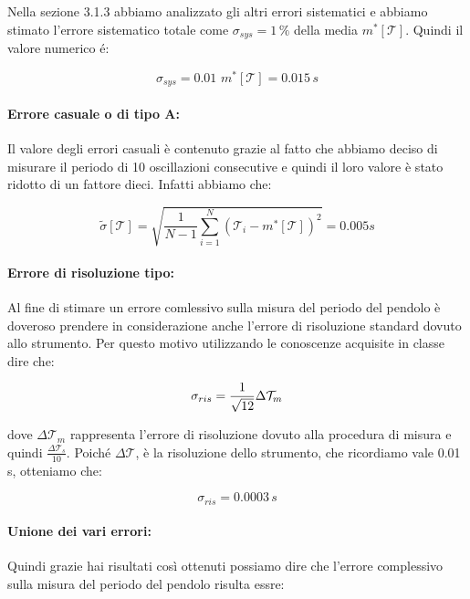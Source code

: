 Nella sezione 3.1.3 abbiamo analizzato gli altri errori sistematici e abbiamo stimato l'errore sistematico totale come $\sigma_{sys} = 1\,\%$ della media $m^*[\mathcal{T}]$. Quindi il valore numerico é:

\begin{equation*}
	\sigma_{sys} = 0.01\,\,m^*[\mathcal{T}] = 0.015\,s
\end{equation*}

\paragraph{Errore casuale o di tipo A:}
Il valore degli errori casuali è contenuto grazie al fatto che abbiamo deciso di misurare il periodo di 10 oscillazioni consecutive e quindi il loro valore è stato ridotto di un fattore dieci. Infatti abbiamo che:

\begin{equation*}
	\tilde{\sigma}[\mathcal{T}] = \sqrt{\frac{1}{N - 1} \sum_{i=1}^{N} (\mathcal{T}_i - m^*[\mathcal{T}])^2} = 0.005 s
\end{equation*}

\paragraph{Errore di risoluzione tipo:}
Al fine di stimare un errore comlessivo sulla misura del periodo del pendolo è doveroso prendere in considerazione anche l'errore di risoluzione standard dovuto allo strumento. Per questo motivo utilizzando le conoscenze acquisite in classe dire che:

\begin{equation*}
	\sigma_{ris} = \frac{1}{\sqrt{12}} \Delta\mathcal{T}_{m}\\
\end{equation*}

dove $\Delta\mathcal{T}_{m}$ rappresenta l'errore di risoluzione dovuto alla procedura di misura e quindi $\frac{\Delta\mathcal{T}_{s}}{10}$.
Poiché $\Delta\mathcal{T}$, è la risoluzione dello strumento, che ricordiamo vale 0.01 s, otteniamo che:

\begin{equation*}
	\sigma_{ris} = 0.0003\,s 
\end{equation*}

\paragraph{Unione dei vari errori:}
Quindi grazie hai risultati così ottenuti possiamo dire che l'errore complessivo sulla misura del periodo del pendolo risulta essre:

